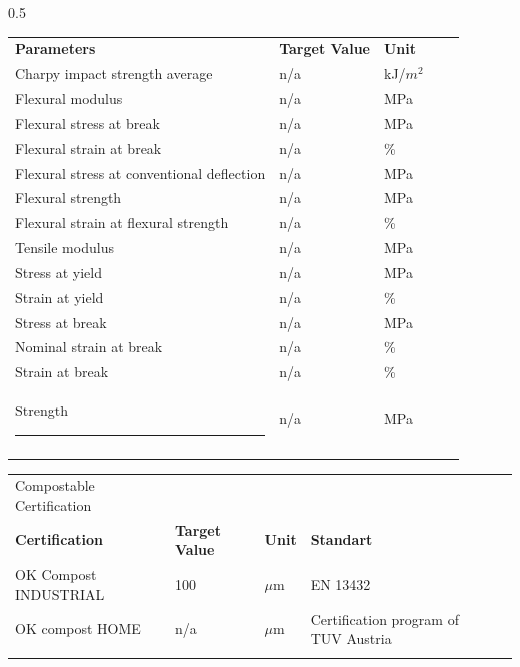 \documentclass{article}
\begin{document}
\begin{center}
\begin{paracol}{2}
\begin{tabularx}{0.5\textwidth}
\end{tabularx}\switchcolumn\begin{tabularx}{0.5\textwidth}
{X l  l  l  l }\textbf{Parameters} & \textbf{Target Value} & \textbf{Unit} &  &  \\
Charpy impact strength average & n/a & kJ/\(m^2\) &  &  \\
\arrayrulecolor{line_color}\hline
Flexural modulus & n/a & MPa &  &  \\
\arrayrulecolor{line_color}\hline
Flexural stress at break & n/a & MPa &  &  \\
\arrayrulecolor{line_color}\hline
Flexural strain at break & n/a & \% &  &  \\
\arrayrulecolor{line_color}\hline
Flexural stress at conventional deflection & n/a & MPa &  &  \\
\arrayrulecolor{line_color}\hline
Flexural strength & n/a & MPa &  &  \\
\arrayrulecolor{line_color}\hline
Flexural strain at flexural strength & n/a & \% &  &  \\
\arrayrulecolor{line_color}\hline
Tensile modulus & n/a & MPa &  &  \\
\arrayrulecolor{line_color}\hline
Stress at yield & n/a & MPa &  &  \\
\arrayrulecolor{line_color}\hline
Strain at yield & n/a & \% &  &  \\
\arrayrulecolor{line_color}\hline
Stress at break & n/a & MPa &  &  \\
\arrayrulecolor{line_color}\hline
Nominal strain at break & n/a & \% &  &  \\
\arrayrulecolor{line_color}\hline
Strain at break & n/a & \% &  &  \\
\arrayrulecolor{line_color}\hline
Strength \rule{80pt}{0pt} & n/a & MPa &  &  \\
\arrayrulecolor{line_color}\hline

\end{tabularx}
\end{paracol}
\end{center}
\begin{center}
\begin{tabularx}
{\textwidth}{X l  l  l  l }\rowcolor{color_title}Compostable Certification &  &  &  &  \\
\textbf{Certification} & \textbf{Target Value} & \textbf{Unit} & \textbf{Standart} &  \\
OK Compost INDUSTRIAL & 100 & \(\mu\)m & EN 13432 &  \\
\arrayrulecolor{line_color}\hline
OK compost HOME & n/a & \(\mu\)m & Certification program of TUV Austria &  \\
\arrayrulecolor{line_color}\hline

\end{tabularx}
\end{center}
\end{document}
